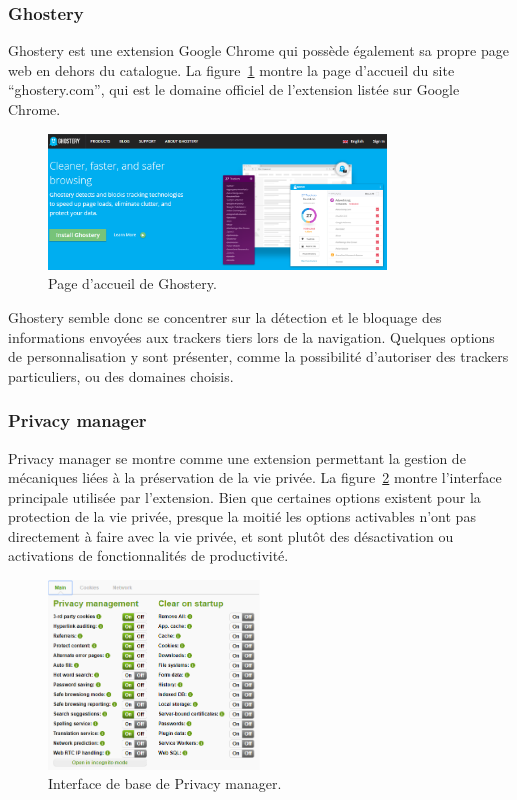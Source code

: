 		\subsubsection{Ghostery}

			Ghostery est une extension Google Chrome qui possède également sa propre page web en dehors du catalogue. La figure~\ref{a-ghostery} montre la page d'accueil du site ``ghostery.com'', qui est le domaine officiel de l'extension listée sur Google Chrome.

			\begin{figure}[h]
				\centering
				\includegraphics[width=0.8\textwidth]{images/analysis/ghostery}
				\caption{Page d'accueil de Ghostery\cite{ghostery}.}
				\label{a-ghostery}
			\end{figure}

			Ghostery semble donc se concentrer sur la détection et le bloquage des informations envoyées aux trackers tiers lors de la navigation. Quelques options de personnalisation y sont présenter, comme la possibilité d'autoriser des trackers particuliers, ou des domaines choisis.

		\subsubsection{Privacy manager}

			Privacy manager se montre comme une extension permettant la gestion de mécaniques liées à la préservation de la vie privée. La figure~\ref{a-privacymanager} montre l'interface principale utilisée par l'extension.
			Bien que certaines options existent pour la protection de la vie privée, presque la moitié les options activables n'ont pas directement à faire avec la vie privée, et sont plutôt des désactivation ou activations de fonctionnalités de productivité.

			\begin{figure}[h]
				\centering
				\includegraphics[width=0.5\textwidth]{images/analysis/privacy-manager}
				\caption{Interface de base de Privacy manager\cite{privacymanager}.}
				\label{a-privacymanager}
			\end{figure}

